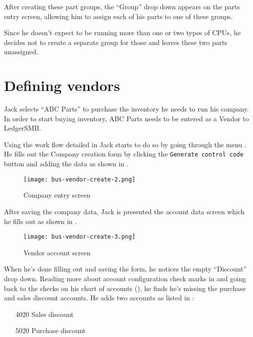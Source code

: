 After creating these part groups, the ``Group'' drop down appears on the parts entry screen,
allowing him to assign each of his parts to one of these groups.

Since he doesn't expect to be running more than one or two types of CPUs, he decides
not to create a separate group for those and leaves these two parts unassigned.

\section{Defining vendors}
\label{sec-stock-defining-vendors}

Jack selects ``ABC Parts'' to purchase the inventory he needs to run his company. In
order to start buying inventory, ABC Parts needs to be entered as a Vendor to LedgerSMB.

Using the work flow detailed in  Jack starts to do so by going through the menu .
He fills out the Company creation form by clicking the {\tt Generate control code}
button and adding the data as shown in .

\begin{figure}[h]
\centering
\texttt{[image: bus-vendor-create-2.png]}
\caption{Company entry screen}
\label{fig:vendor-create-1}
\end{figure}

After saving the company data, Jack is presented the account data screen which he fills out
as shown in .

\begin{figure}[h]
\centering
\texttt{[image: bus-vendor-create-3.png]}
\caption{Vendor account screen}
\label{fig:vendor-create-2}
\end{figure}

When he's done filling out and saving the form,
he notices the empty ``Discount'' drop down. Reading more about account configuration
check marks in  and going back to the checks on his
chart of accounts (), he finds he's missing the purchase and
sales discount accounts. He adds two accounts as listed in :

\begin{itemize}
\item [4020] Sales discount
\item [5020] Purchase discount
\end{itemize}

